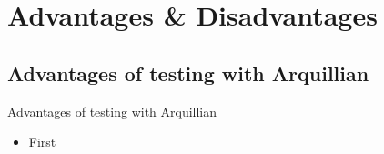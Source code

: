 \section[Advantages \& Disadvantages]{Advantages \& Disadvantages}
\subsection{Advantages of testing with Arquillian}
\begin{frame}{Advantages of testing with Arquillian}
  \begin{itemize}
  \item First
  \end{itemize}
\end{frame}

